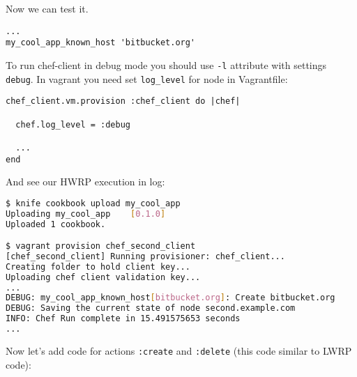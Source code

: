 Now we can test it.

\begin{lstlisting}[label=lst:cookbook-hwrp8]
...
my_cool_app_known_host 'bitbucket.org'
\end{lstlisting}

To run chef-client in debug mode you should use \lstinline!-l! attribute with settings \lstinline!debug!. In vagrant you need set \lstinline!log_level! for node in Vagrantfile:

\begin{lstlisting}[label=lst:cookbook-hwrp9]
chef_client.vm.provision :chef_client do |chef|

  chef.log_level = :debug

  ...
end
\end{lstlisting}

And see our HWRP execution in log:

\begin{lstlisting}[language=Bash,label=lst:cookbook-hwrp10]
$ knife cookbook upload my_cool_app
Uploading my_cool_app    [0.1.0]
Uploaded 1 cookbook.

$ vagrant provision chef_second_client
[chef_second_client] Running provisioner: chef_client...
Creating folder to hold client key...
Uploading chef client validation key...
...
DEBUG: my_cool_app_known_host[bitbucket.org]: Create bitbucket.org
DEBUG: Saving the current state of node second.example.com
INFO: Chef Run complete in 15.491575653 seconds
...
\end{lstlisting}

Now let's add code for actions \lstinline!:create! and \lstinline!:delete! (this code similar to LWRP code):


